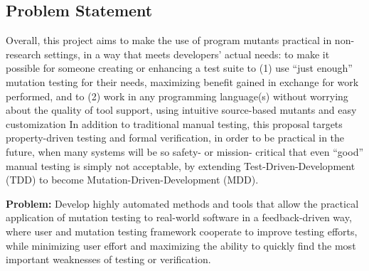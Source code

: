 
\subsection{Problem Statement}

Overall, this project aims to make the use of program mutants practical in
non-research settings, in a way that meets developers' actual needs: to make it
possible for someone creating or enhancing a test suite to (1) use ``just
enough'' mutation testing for their needs, maximizing benefit gained in exchange
for work performed, and to (2) work in any programming language(s) without worrying
about the quality of tool support, using intuitive source-based
mutants and easy customization
In addition to traditional manual testing, this proposal targets
property-driven testing and formal verification, in
order to be practical in the future, when many systems will be so
safety- or mission- critical that even ``good'' manual testing is simply not 
acceptable, by extending Test-Driven-Development (TDD) to become
Mutation-Driven-Development (MDD).


\begin{framed} {\bf Problem:} Develop highly automated methods and tools that
  allow the practical application of mutation testing to real-world software in
  a feedback-driven way, where user and mutation testing framework cooperate to
  improve testing efforts, while minimizing user effort and maximizing the
  ability to quickly find the most important weaknesses of testing or
  verification.
\end{framed}



